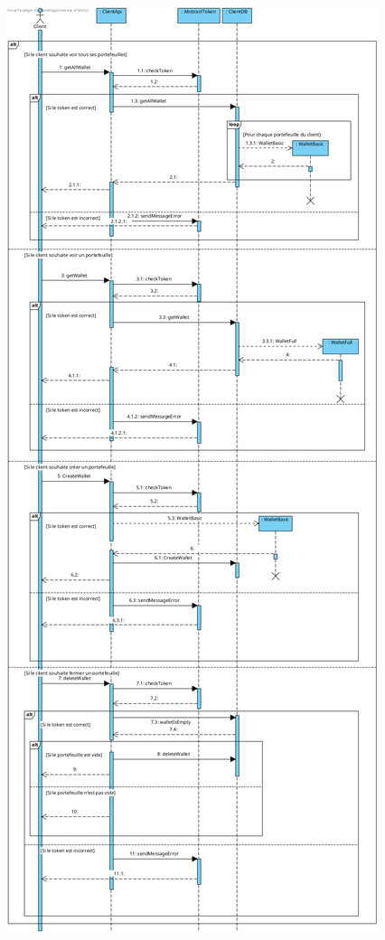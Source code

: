 \newpage
\begin{figure}[h]
\centering
\includegraphics[height = 0.7\textheight]{Base/sequence/img/client/Voir-les-portefeuilles.png}
\end{figure}
\newpage

